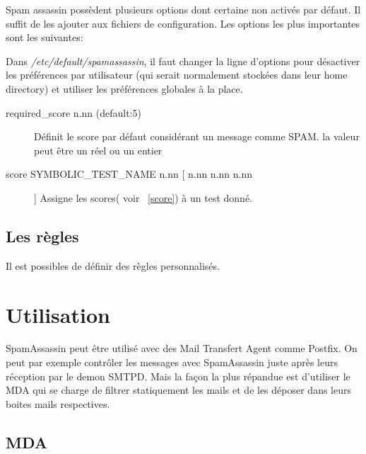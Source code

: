 \documentclass[a4paper,11pt]{article}
\begin{document}
Spam assassin possèdent plusieurs options dont certaine non activés par défaut. Il suffit de les ajouter aux fichiers 
de configuration.
Les options les plus importantes sont les suivantes:

\begin{description}
 \item [Désactiver les préférences utilisateurs]Dans \emph{/etc/default/spamassassin}, il faut changer la ligne d'options pour désactiver les préférences par utilisateur (qui serait normalement stockées dans leur home directory) et utiliser les préférences globales à la place. 
 \item [Options de score] \begin{description}
                           \item [required\_score n.nn (default:5)] Définit le score par défaut considérant un message comme SPAM. la valeur peut être un réel ou un entier
                           \item [score SYMBOLIC\_TEST\_NAME n.nn [ n.nn n.nn n.nn ]] Assigne les scores( voir ~\ref{score}) à un test donné.
                          \end{description}
\item 

\end{description}
\label{baye_conf}


\subsection{Les règles}

Il est possibles de définir des règles personnalisés. 

\section{ Utilisation }


SpamAssassin peut être utilisé avec des Mail Transfert Agent comme Postfix. On peut par exemple contrôler les messages
avec SpamAssassin juste après leurs réception par le demon SMTPD. Mais la façon la plus répandue est d'utiliser le MDA qui se charge
de filtrer statiquement les mails et de les déposer dans leurs boites mails respectives. 

\subsection{MDA}
\end{document}
